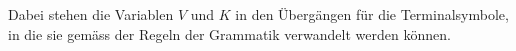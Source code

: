 \begin{loesung}
\begin{center}
\end{center}
Dabei stehen die Variablen $V$ und $K$ in den Übergängen für 
die Terminalsymbole, in die sie gemäss der Regeln der Grammatik
verwandelt werden können.


\end{loesung}
